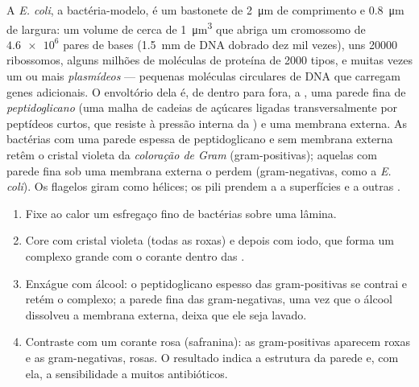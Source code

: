 \begin{proposition}\label{prop:b1:cell-unit-of-life:bacterium}
A \emph{E. coli}, a bactéria-modelo, é um bastonete de \qty{2}{\micro m}
de comprimento e \qty{0.8}{\micro m} de largura: um volume de cerca de
\qty{1}{\micro m^3} que abriga um cromossomo de $\num{4.6e6}$ pares de
bases (\qty{1.5}{mm} de DNA dobrado dez mil vezes), uns \num{20000}
ribossomos, alguns milhões de moléculas de proteína de \num{2000} tipos,
e muitas vezes um ou mais \emph{plasmídeos} ---
pequenas moléculas circulares de DNA que carregam genes adicionais. O
envoltório dela é, de dentro para fora, a , uma
parede fina de \emph{peptidoglicano} (uma malha de
cadeias de açúcares ligadas transversalmente por peptídeos curtos, que
resiste à pressão interna da ) e uma membrana externa. As
bactérias com uma parede espessa de peptidoglicano e sem membrana
externa retêm o cristal violeta da
\emph{coloração de Gram} (gram-positivas);
aquelas com parede fina sob uma membrana externa o perdem
(gram-negativas, como a \emph{E. coli}). Os flagelos giram como hélices;
os pili prendem a  a superfícies e a outras .
\end{proposition}

\begin{method}\label{met:b1:cell-unit-of-life:gram}
\begin{enumerate}
  \item Fixe ao calor um esfregaço fino de bactérias sobre uma lâmina.
  \item Core com cristal violeta (todas as  roxas) e depois com
        iodo, que forma um complexo grande com o corante dentro das
        .
  \item Enxágue com álcool: o peptidoglicano espesso das 
        gram-positivas se contrai e retém o complexo; a parede fina das
        gram-negativas, uma vez que o álcool dissolveu a membrana
        externa, deixa que ele seja lavado.
  \item Contraste com um corante rosa (safranina): as 
        gram-positivas aparecem roxas e as gram-negativas, rosas. O
        resultado indica a estrutura da parede e, com ela, a
        sensibilidade a muitos antibióticos.
\end{enumerate}
\end{method}

